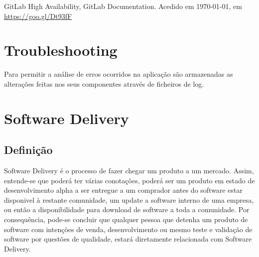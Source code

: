 \documentclass[12pt,a4paper]{article}
\begin{document}
\bigbreak
GitLab High Availability, GitLab Documentation. Acedido em \today, em \url{https://goo.gl/Dt93fF}















\iffalse
\newpage
\section{Troubleshooting}

Para permitir a análise de erros ocorridos na aplicação são armazenadas as alterações feitas nos seus componentes através de ficheiros de log.
\newpage

\section{Software Delivery}
\subsection{Definição}
Software Delivery é o processo de fazer chegar um produto a um mercado. Assim, entende-se que poderá ter várias conotações, poderá ser um produto em estado de desenvolvimento alpha a ser entregue a um comprador antes do software estar disponivel à restante comunidade, um update a software interno de uma empresa, ou então a disponibilidade para download de software a toda a comunidade.
Por consequência, pode-se concluir que qualquer pessoa que detenha um produto de software com intenções de venda, desenvolvimento ou mesmo teste e validação de software por questões de qualidade, estará diretamente relacionada com Software Delivery.
\end{document}
